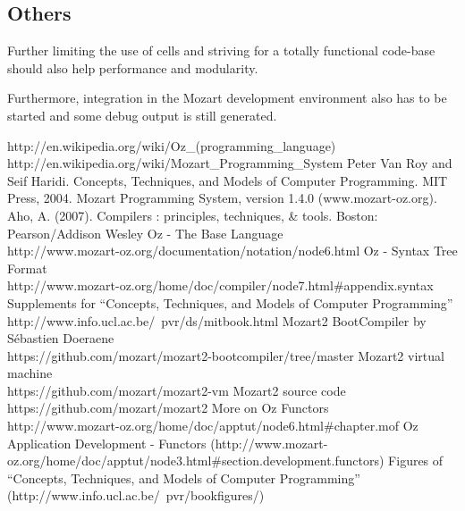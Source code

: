 \documentclass[a4paper]{memoir}
\begin{document}
\subsection{Others}

Further limiting the use of cells and striving for a totally functional code-base should also help 
performance and modularity.

Furthermore, integration in the Mozart development environment also has to be started and some debug output is still generated.

\begin{appendices} 


\begin{thebibliography}{1}
   http://en.wikipedia.org/wiki/Oz\_(programming\_language)
   http://en.wikipedia.org/wiki/Mozart\_Programming\_System
    Peter Van Roy and Seif Haridi.  Concepts, Techniques, and Models of Computer Programming. MIT Press, 2004.
   Mozart Programming System, version 1.4.0 (www.mozart-oz.org).
   Aho, A. (2007). Compilers : principles, techniques, \& tools. Boston: Pearson/Addison Wesley
   Oz - The Base Language \\
    http://www.mozart-oz.org/documentation/notation/node6.html
   Oz - Syntax Tree Format 
    \\http://www.mozart-oz.org/home/doc/compiler/node7.html\#appendix.syntax
   Supplements for ``Concepts, Techniques, and Models of Computer Programming'' \\
    http://www.info.ucl.ac.be/~pvr/ds/mitbook.html
   Mozart2 BootCompiler by S\'{e}bastien Doeraene \\
    https://github.com/mozart/mozart2-bootcompiler/tree/master
   Mozart2 virtual machine \\
    https://github.com/mozart/mozart2-vm
   Mozart2 source code \\
    https://github.com/mozart/mozart2
   More on Oz Functors \\
    http://www.mozart-oz.org/home/doc/apptut/node6.html\#chapter.mof
   Oz Application Development - Functors (http://www.mozart-oz.org/home/doc/apptut/node3.html\#section.development.functors)
   Figures of ``Concepts, Techniques, and Models of Computer Programming'' (http://www.info.ucl.ac.be/~pvr/bookfigures/)
\end{thebibliography}



\end{appendices}
\end{document}
